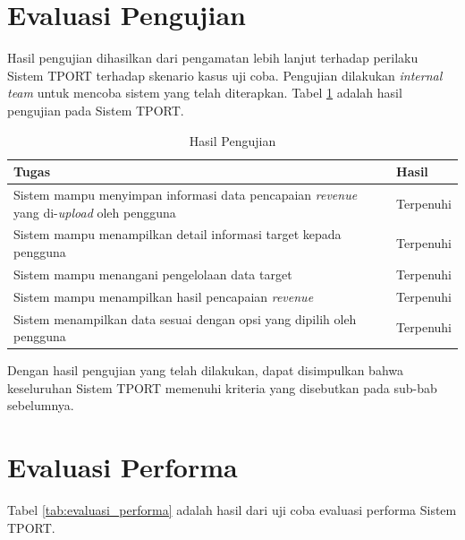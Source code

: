 \section{Evaluasi Pengujian}
\tab Hasil pengujian dihasilkan dari pengamatan lebih lanjut terhadap perilaku Sistem TPORT terhadap skenario kasus uji coba. Pengujian dilakukan \textit{internal team} untuk mencoba sistem yang telah diterapkan. Tabel \ref{tab:hasil_pengujian} adalah hasil pengujian pada Sistem TPORT.
\begin{table}[h!]
	\centering
	\begin{tabular}{|p{6cm}|p{4cm}|}
	\hline
	\textbf{Tugas} & \textbf{Hasil}\\ \hline
	Sistem mampu menyimpan informasi data pencapaian \textit{revenue} yang di-\textit{upload} oleh pengguna & Terpenuhi\\ \hline
	Sistem mampu menampilkan detail informasi target kepada pengguna & Terpenuhi\\ \hline
	Sistem mampu menangani pengelolaan data target & Terpenuhi\\ \hline
	Sistem mampu menampilkan hasil pencapaian \textit{revenue} & Terpenuhi\\ \hline
	Sistem menampilkan data sesuai dengan opsi yang dipilih oleh pengguna & Terpenuhi\\ \hline
	\end{tabular}\caption{Hasil Pengujian}
		\label{tab:hasil_pengujian}
\end{table}

Dengan hasil pengujian yang telah dilakukan, dapat disimpulkan bahwa keseluruhan Sistem TPORT memenuhi kriteria yang disebutkan pada sub-bab sebelumnya.

\section{Evaluasi Performa}
Tabel \ref{tab:evaluasi_performa} adalah hasil dari uji coba evaluasi performa Sistem TPORT.


